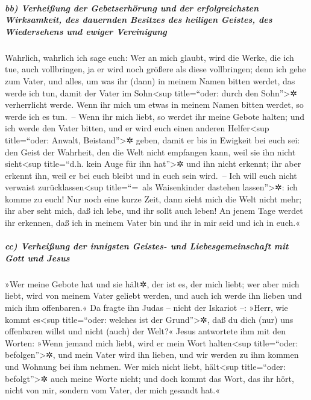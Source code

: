 \hypertarget{bb-verheiuxdfung-der-gebetserhuxf6rung-und-der-erfolgreichsten-wirksamkeit-des-dauernden-besitzes-des-heiligen-geistes-des-wiedersehens-und-ewiger-vereinigung}{%
\subparagraph{bb) Verheißung der Gebetserhörung und der erfolgreichsten
Wirksamkeit, des dauernden Besitzes des heiligen Geistes, des
Wiedersehens und ewiger
Vereinigung}\label{bb-verheiuxdfung-der-gebetserhuxf6rung-und-der-erfolgreichsten-wirksamkeit-des-dauernden-besitzes-des-heiligen-geistes-des-wiedersehens-und-ewiger-vereinigung}}

 Wahrlich, wahrlich ich sage euch: Wer an mich glaubt,
wird die Werke, die ich tue, auch vollbringen, ja er wird noch größere
als diese vollbringen;  denn ich gehe zum Vater, und
alles, um was ihr (dann) in meinem Namen bitten werdet, das werde ich
tun, damit der Vater im Sohn\textless sup title=``oder: durch den
Sohn''\textgreater✲ verherrlicht werde.  Wenn ihr mich um
etwas in meinem Namen bitten werdet, so werde ich es tun.~--
 Wenn ihr mich liebt, so werdet ihr meine Gebote halten;
 und ich werde den Vater bitten, und er wird euch einen
anderen Helfer\textless sup title=``oder: Anwalt,
Beistand''\textgreater✲ geben, damit er bis in Ewigkeit bei euch sei:
 den Geist der Wahrheit, den die Welt nicht empfangen
kann, weil sie ihn nicht sieht\textless sup title=``d.h. kein Auge für
ihn hat''\textgreater✲ und ihn nicht erkennt; ihr aber erkennt ihn, weil
er bei euch bleibt und in euch sein wird.~--  Ich will
euch nicht verwaist zurücklassen\textless sup title=``=~als Waisenkinder
dastehen lassen''\textgreater✲: ich komme zu euch!  Nur
noch eine kurze Zeit, dann sieht mich die Welt nicht mehr; ihr aber seht
mich, daß ich lebe, und ihr sollt auch leben!  An jenem
Tage werdet ihr erkennen, daß ich in meinem Vater bin und ihr in mir
seid und ich in euch.«

\hypertarget{cc-verheiuxdfung-der-innigsten-geistes--und-liebesgemeinschaft-mit-gott-und-jesus}{%
\subparagraph{cc) Verheißung der innigsten Geistes- und
Liebesgemeinschaft mit Gott und
Jesus}\label{cc-verheiuxdfung-der-innigsten-geistes--und-liebesgemeinschaft-mit-gott-und-jesus}}

 »Wer meine Gebote hat und sie hält✲, der ist es, der
mich liebt; wer aber mich liebt, wird von meinem Vater geliebt werden,
und auch ich werde ihn lieben und mich ihm offenbaren.« 
Da fragte ihn Judas -- nicht der Iskariot --: »Herr, wie kommt
es\textless sup title=``oder: welches ist der Grund''\textgreater✲, daß
du dich (nur) uns offenbaren willst und nicht (auch) der Welt?«
 Jesus antwortete ihm mit den Worten: »Wenn jemand mich
liebt, wird er mein Wort halten\textless sup title=``oder:
befolgen''\textgreater✲, und mein Vater wird ihn lieben, und wir werden
zu ihm kommen und Wohnung bei ihm nehmen.  Wer mich nicht
liebt, hält\textless sup title=``oder: befolgt''\textgreater✲ auch meine
Worte nicht; und doch kommt das Wort, das ihr hört, nicht von mir,
sondern vom Vater, der mich gesandt hat.«

